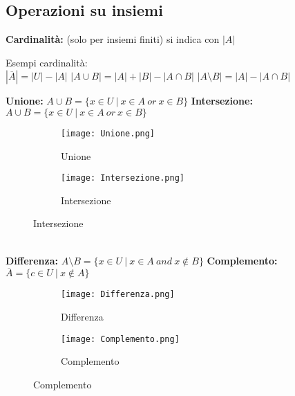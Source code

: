 \subsection{Operazioni su insiemi}
\textbf{Cardinalità:} (solo per insiemi finiti) si indica con $|A|$
\begin{example}
    Esempi cardinalità:\\
    $|\overline{A}| = |U| - |A|$ \hspace{.6cm} $|A \cup B| = |A| + |B| - |A \cap B|$ \hspace{.6cm} $|A \setminus B| = |A| - |A \cap B|$\\
\end{example}
\hspace{-15pt}\textbf{Unione:} $A \cup B = \{x \in U \: | \: x \in A \: or \: x \in B\}$ \hfill
\textbf{Intersezione:} $A \cup B = \{x \in U \: | \: x \in A \: or \: x \in B\}$
\begin{figure}[h!]
    \vspace{-7pt}
    \begin{subfigure}{.5\textwidth}
        \centering
        \texttt{[image: Unione.png]}
        \caption{Unione}
        \label{fig:unione}
    \end{subfigure}
    \begin{subfigure}{.5\textwidth}
        \centering
        \texttt{[image: Intersezione.png]}
        \caption{Intersezione}
        \label{fig:intesezione}
    \end{subfigure}
\end{figure}
\\
\textbf{Differenza:} $A \setminus B = \{x \in U \: | \: x \in A \: and \: x \notin B\}$\hspace{1cm}
\textbf{Complemento:} $\overline{A} = \{c \in U \: | \: x \notin A\}$
\begin{figure}[h!]
        \vspace{-10pt}
    \begin{subfigure}{.5\textwidth}
        \centering
        \texttt{[image: Differenza.png]}
        \caption{Differenza}
        \label{fig:differenza}
    \end{subfigure}
    \begin{subfigure}{.5\textwidth}
        \centering
        \texttt{[image: Complemento.png]}
        \caption{Complemento}
        \label{fig:complemento}
    \end{subfigure}
\end{figure}

